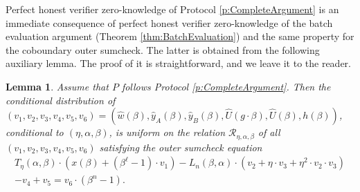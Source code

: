 \documentclass[10pt,article,oneside]{memoir}
\newtheorem{lem}[]{Lemma}
\theoremstyle{definition}
\theoremstyle{remark}
\begin{document}
Perfect honest verifier zero-knowledge of Protocol \ref{p:CompleteArgument} is an immediate consequence of perfect honest verifier zero-knowledge of the batch evaluation argument (Theorem \ref{thm:BatchEvaluation}) and the same property for the coboundary outer sumcheck.
The latter is obtained from the following auxiliary lemma. 
The proof of it is straightforward, and we leave it to the reader.
\begin{lem}
\label{l:zk}
Assume that $P$ follows Protocol \ref{p:CompleteArgument}.
Then the conditional distribution of $(v_1,v_2,v_3,v_4,v_5,v_6)=(\hat w(\beta), \hat y_A(\beta),\hat y_B(\beta), \hat U(g\cdot \beta), \hat U(\beta),h(\beta))$, conditional to $(\eta, \alpha, \beta)$, is uniform on the relation $\mathcal R_{\eta,\alpha,\beta}$ of all $(v_1,v_2,v_3,v_4, v_5,v_6)$ satisfying the outer sumcheck equation
\begin{multline*}
    T_\eta(\alpha,\beta)\cdot (x(\beta)+(\beta^\ell-1)\cdot v_1) - L_n(\beta,\alpha)\cdot (v_2 +\eta\cdot v_3 + \eta^2\cdot v_2\cdot v_3) 
    \\
    - v_4 + v_5 
    = v_6\cdot (\beta^n-1).
\end{multline*}
\end{lem}



\end{document}
